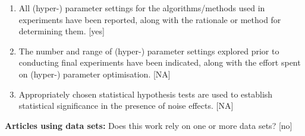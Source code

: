 \documentclass[manuscript,screen,review]{jair}
\begin{document}
\begin{enumerate}
    \item All (hyper-) parameter settings for the algorithms/methods used in experiments have been reported, along with the rationale or method for determining them. [yes]
    \item The number and range of (hyper-) parameter settings explored prior to conducting final experiments have been indicated, along with the effort spent on (hyper-) parameter optimisation. [NA]
    \item Appropriately chosen statistical hypothesis tests are used to establish statistical significance in the presence of noise effects. [NA]
\end{enumerate}

\noindent\textbf{Articles using data sets:} Does this work rely on one or more data sets? [no]
\end{document}
